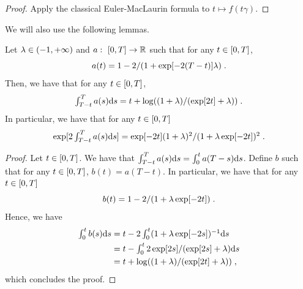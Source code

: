 \begin{proof}
  Apply the classical Euler-MacLaurin formula to $t \mapsto f(t \gamma)$.
\end{proof}


We will also use the following lemmas.

\begin{lemma}
  \label{lemma:integral_uno}
  Let $\lambda \in \left(-1, +\infty\right)$ and $a: \ \left[0,T\right] \to \mathbb{R}$ such
  that for any $t \in \left[0,T\right]$,
  \begin{equation}
    a(t) = 1 - 2/(1 + \exp[-2(T-t)]\lambda) \; . 
  \end{equation}
  Then, we have that for any $t \in \left[0,T\right]$,
  \begin{equation}
    \textstyle{
      \int_{T-t}^T a(s) \mathrm{d}s = t + \log((1+\lambda)/(\exp[2t]+ \lambda)) \;. 
      }
    \end{equation}
    In particular, we have that for any $t \in \left[0,T\right]$
    \begin{equation}
          \textstyle{
      \exp[2\int_{T-t}^T a(s) \mathrm{d}s] = \exp[-2t] (1+\lambda)^2 /(1+ \lambda\exp[-2t])^2 \;. 
      }
    \end{equation}

  \end{lemma}

  \begin{proof}
    Let $t \in \left[0,T\right]$. We have that
    $\int_{T-t}^T a(s) \mathrm{d} s = \int_0^{t} a(T-s) \mathrm{d} s$.  Define $b$ such that
    for any $t \in \left[0,T\right]$, $b(t) = a (T-t)$. In particular, we have that
    for any $t \in \left[0,T\right]$
    \begin{equation}
      b(t) = 1 - 2 / (1 +\lambda \exp[-2t]) \; . 
    \end{equation}
    Hence, we have
    \begin{align}
      \textstyle{\int_0^t b(s) \mathrm{d}s} &= \textstyle{t - 2 \int_0^t (1 + \lambda \exp[-2s])^{-1} \mathrm{d}s} \\
                                       &= \textstyle{t - \int_0^t 2 \exp[2s] / (\exp[2s] + \lambda ) \mathrm{d}s} \\
                                       &= \textstyle{t + \log((1 + \lambda)/(\exp[2t] + \lambda)) } \; ,
    \end{align}
    which concludes the proof.
  \end{proof}


